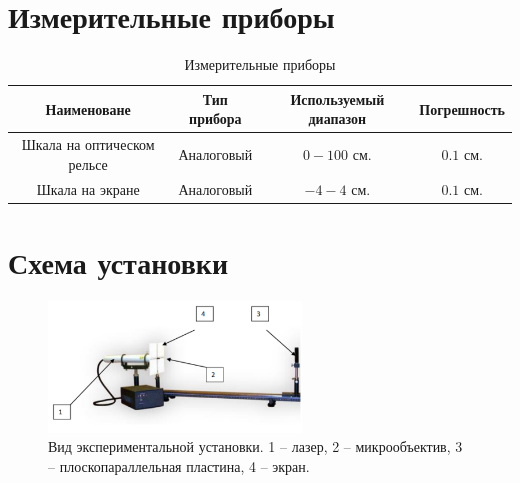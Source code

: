 \documentclass{article}
\begin{document}
\section{Измерительные приборы}
\begin{table}[h]
    \centering
    \bgroup
    \def\arraystretch{1.2}
    \begin{tabular}{|c|c|c|c|}
        \hline
        Наименоване & Тип прибора & Используемый диапазон & Погрешность \\
        \hline
        Шкала на оптическом рельсе & Аналоговый & $0-100$ см. & $0.1$ см. \\
        \hline
        Шкала на экране & Аналоговый & $-4 - 4$ см. & $0.1$ см. \\
        \hline
    \end{tabular}
    \egroup
    \caption{Измерительные приборы} 
\end{table}
\section{Схема установки}
\begin{figure}[h!]
    \begin{center}
    \includegraphics[width=0.6\textwidth]{scheme.png}
    \caption{Вид экспериментальной установки. 1 – лазер, 2 – микрообъектив, 3 – плоскопараллельная пластина, 4 – экран.}
    \label{fig:scheme}    
    \end{center}
\end{figure}
\end{document}

